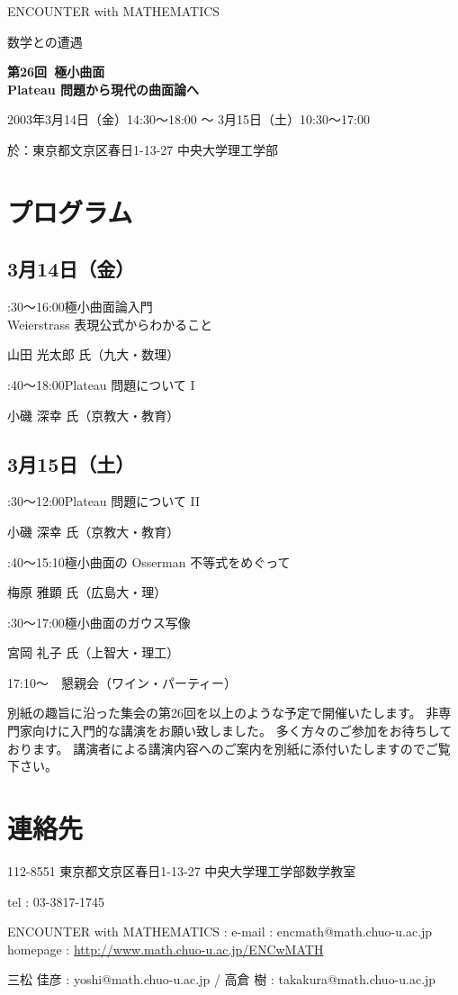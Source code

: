 \documentclass[uplatex,dvipdfmx]{jlreq}
\newcommand{\talk}[3]{%
\noindent
#1\quad #2\par
\hspace*{2em}#3\par\smallskip
}
\newcommand{\EwMnumber}{第26回}
\newcommand{\EwMtitle}{極小曲面\\[2mm]\large Plateau 問題から現代の曲面論へ}
\newcommand{\EwMdate}{2003年3月14日（金）14:30～18:00 ～ 3月15日（土）10:30～17:00}
\newcommand{\EwMplace}{東京都文京区春日1-13-27 中央大学理工学部}
\newcommand{\EwMtitleblock}{

\vspace*{-5mm}

\begin{center}

{\Large ENCOUNTER with MATHEMATICS}

\vspace{2mm}

{\large 数学との遭遇}

\vspace{4mm}

{\Large \bfseries \EwMnumber\ \EwMtitle}

\vspace{4mm}

\EwMdate

\vspace{2mm}

於：\EwMplace

\end{center}

\vspace{2mm}

}
\begin{document}
\EwMtitleblock


\section*{プログラム}

\subsection*{3月14日（金）}

\talk
{14:30～16:00}
{極小曲面論入門\\[1mm]Weierstrass 表現公式からわかること}
{山田 光太郎 氏（九大・数理）}

\talk
{16:40～18:00}
{Plateau 問題について I}
{小磯 深幸 氏（京教大・教育）}

\subsection*{3月15日（土）}

\talk
{10:30～12:00}
{Plateau 問題について II}
{小磯 深幸 氏（京教大・教育）}

\talk
{13:40～15:10}
{極小曲面の Osserman 不等式をめぐって}
{梅原 雅顕 氏（広島大・理）}

\talk
{15:30～17:00}
{極小曲面のガウス写像}
{宮岡 礼子 氏（上智大・理工）}

\bigskip

17:10～　懇親会（ワイン・パーティー）


\bigskip

別紙の趣旨に沿った集会の第26回を以上のような予定で開催いたします。  
非専門家向けに入門的な講演をお願い致しました。  
多く方々のご参加をお待ちしております。  
講演者による講演内容へのご案内を別紙に添付いたしますのでご覧下さい。


\section*{連絡先}

112-8551 東京都文京区春日1-13-27 中央大学理工学部数学教室 

tel : 03-3817-1745  

ENCOUNTER with MATHEMATICS : e-mail : encmath@math.chuo-u.ac.jp  
homepage : \url{http://www.math.chuo-u.ac.jp/ENCwMATH}  

三松 佳彦 : yoshi@math.chuo-u.ac.jp / 高倉 樹 : takakura@math.chuo-u.ac.jp
\end{document}
